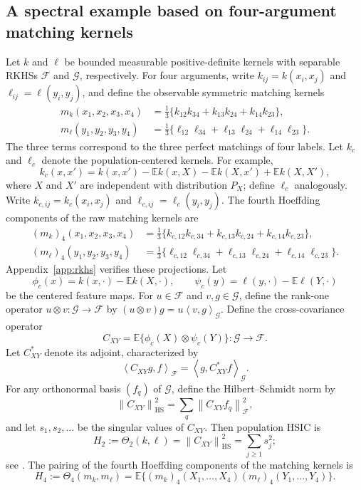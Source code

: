 \documentclass[11pt]{article}
\theoremstyle{plain}
\theoremstyle{definition}
\theoremstyle{remark}
\newcommand{\E}{\mathbb E}
\newcommand{\inner}[2]{\left\langle #1,#2\right\rangle}
\newcommand{\norm}[1]{\left\lVert #1\right\rVert}
\begin{document}
\subsection{\texorpdfstring{{A spectral example based on four-argument matching kernels}}{A spectral example based on four-argument matching kernels}}\label{sec:example}
Let $k$ and $\ell$ be bounded measurable positive-definite kernels with
separable RKHSs $\mathcal F$ and $\mathcal G$, respectively.  For four
arguments, write $k_{ij}=k(x_i,x_j)$ and
$\ell_{ij}=\ell(y_i,y_j)$, and define the observable symmetric matching
kernels
\begin{align}
 m_k(x_1,x_2,x_3,x_4)
 &=\frac13\{k_{12}k_{34}+k_{13}k_{24}+k_{14}k_{23}\},\label{eq:matching-k}\\
 m_\ell(y_1,y_2,y_3,y_4)
 &=\frac13\{\ell_{12}\ell_{34}+\ell_{13}\ell_{24}
                  +\ell_{14}\ell_{23}\}.\label{eq:matching-l}
\end{align}
The three terms correspond to the three perfect matchings of four labels. Let $k_c$ and $\ell_c$ denote the population-centered kernels.  For example,
\[
 k_c(x,x')
 =k(x,x')-\E k(x,X)-\E k(X,x')+\E k(X,X'),
\]
where $X$ and $X'$ are independent with distribution $P_X$; define
$\ell_c$ analogously.  Write
$k_{c,ij}=k_c(x_i,x_j)$ and $\ell_{c,ij}=\ell_c(y_i,y_j)$.  The
fourth Hoeffding components of the raw matching kernels are
\begin{align*}
 (m_k)_4(x_1,x_2,x_3,x_4)
 &=\frac13\{k_{c,12}k_{c,34}+k_{c,13}k_{c,24}
                  +k_{c,14}k_{c,23}\},\\
 (m_\ell)_4(y_1,y_2,y_3,y_4)
 &=\frac13\{\ell_{c,12}\ell_{c,34}+\ell_{c,13}\ell_{c,24}
                  +\ell_{c,14}\ell_{c,23}\}.
\end{align*}
Appendix~\ref{app:rkhs} verifies these projections.
Let
\[
 \phi_c(x)=k(x,\cdot)-\E k(X,\cdot),
 \qquad
 \psi_c(y)=\ell(y,\cdot)-\E \ell(Y,\cdot)
\]
be the centered feature maps.  For $u\in\mathcal F$ and $v,g\in\mathcal G$,
define the rank-one operator $u\otimes v:\mathcal G\to\mathcal F$ by
$(u\otimes v)g=u\inner{v}{g}_{\mathcal G}$.  Define the cross-covariance
operator
\[
 C_{XY}=\E\{\phi_c(X)\otimes\psi_c(Y)\}:\mathcal G\to\mathcal F.
\]
Let $C_{XY}^{\ast}$ denote its adjoint, characterized by
\[
 \inner{C_{XY}g}{f}_{\mathcal F}
 =\inner{g}{C_{XY}^{\ast}f}_{\mathcal G}.
\]
For any orthonormal basis $(f_q)$ of $\mathcal G$, define the
Hilbert--Schmidt norm by
\[
 \norm{C_{XY}}_{\mathrm{HS}}^2
 =\sum_q\norm{C_{XY}f_q}_{\mathcal F}^2,
\]
and let $s_1,s_2,\ldots$ be the singular values of $C_{XY}$.  Then population
HSIC is
\begin{equation}\label{eq:H2-spectrum}
 H_2:=\Theta_2(k,\ell)
 =\norm{C_{XY}}_{\mathrm{HS}}^2
 =\sum_{j\ge1}s_j^2;
\end{equation}
see \citet{GrettonEtAl2005}.  The pairing of the fourth Hoeffding
components of the matching kernels is
\[
 H_4:=\Theta_4(m_k,m_\ell)
 =\E\{(m_k)_4(X_1,\ldots,X_4)
       (m_\ell)_4(Y_1,\ldots,Y_4)\}.
\]
\end{document}
